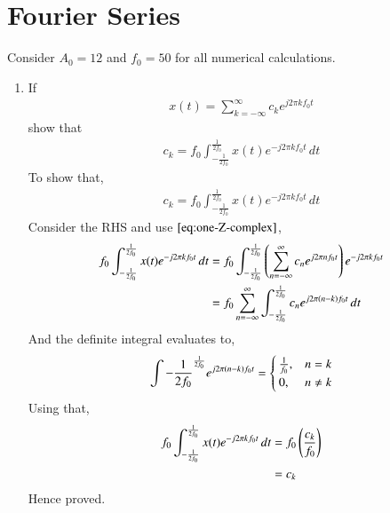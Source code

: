 \documentclass[journal,12pt,twocolumn]{IEEEtran}
\renewcommand\thesection{\arabic{section}}
\begin{document}
\section{Fourier Series}
Consider $A_0 =12$ and $f_0 = 50$ for all numerical calculations.
\begin{enumerate}[label=\thesection.\arabic*,ref=\thesection.\theenumi]
\item If
\begin{align}
	x(t) = \sum_{k = -\infty}^{\infty}c_ke^{j2\pi kf_0 t}
\label{eq:one-Z-complex}
\end{align}
show that 
\begin{align}
	c_k = f_0\int_{-\frac{1}{2f_0}}^{\frac{1}{2f_0}}x(t)e^{-j2\pi kf_0 t}\, dt
\label{eq:one-Z}
\end{align}
\solution 
To show that, 
\begin{align}
	c_k = f_0\int_{-\frac{1}{2f_0}}^{\frac{1}{2f_0}}x(t)e^{-j2\pi kf_0 t}\, dt
\end{align}
Consider the RHS and use $\eqref{eq:one-Z-complex}$,
  \begin{align}
	  f_0\int_{-\frac{1}{2f_0}}^{\frac{1}{2f_0}}x(t)e^{-j2\pi kf_0 t}\, dt &= f_0\int_{-\frac{1}{2f_0}}^{\frac{1}{2f_0}}\left(\sum_{n = -\infty}^{\infty}c_ne^{j2\pi nf_0 t}\right)
e^{-j2\pi kf_0 t}\\
			     &= f_0\sum_{n = -\infty}^{\infty}\int_{-\frac{1}{2f_0}}^{\frac{1}{2f_0}}c_ne^{j 2\pi\left(n-k\right)f_0t} \,dt 
  \end{align}
  And the definite integral evaluates to, 
   \begin{align}
	   \int{-\frac{1}{2f_0}}^{\frac{1}{2f_0}}e^{j 2\pi \left(n-k\right)f_0t} = \begin{cases}
		                                                                 \frac{1}{f_0} , & n = k \\
										  0            , & n \neq k
									      \end{cases}
   \end{align}
Using that, 
     \begin{align}
	     f_0\int_{-\frac{1}{2f_0}}^{\frac{1}{2f_0}}x(t)e^{-j2\pi kf_0 t}\, dt &= f_0\left(\frac{c_k}{f_0}\right) \\
	                                                                           &= c_k
     \end{align}
Hence proved.


\end{enumerate}
\end{document}
